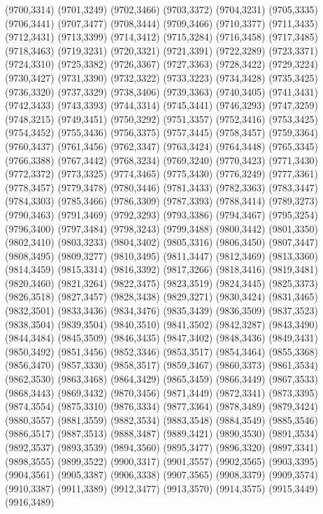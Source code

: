 (9700,3314)
(9701,3249)
(9702,3466)
(9703,3372)
(9704,3231)
(9705,3335)
(9706,3441)
(9707,3477)
(9708,3444)
(9709,3466)
(9710,3377)
(9711,3435)
(9712,3431)
(9713,3399)
(9714,3412)
(9715,3284)
(9716,3458)
(9717,3485)
(9718,3463)
(9719,3231)
(9720,3321)
(9721,3391)
(9722,3289)
(9723,3371)
(9724,3310)
(9725,3382)
(9726,3367)
(9727,3363)
(9728,3422)
(9729,3224)
(9730,3427)
(9731,3390)
(9732,3322)
(9733,3223)
(9734,3428)
(9735,3425)
(9736,3320)
(9737,3329)
(9738,3406)
(9739,3363)
(9740,3405)
(9741,3431)
(9742,3433)
(9743,3393)
(9744,3314)
(9745,3441)
(9746,3293)
(9747,3259)
(9748,3215)
(9749,3451)
(9750,3292)
(9751,3357)
(9752,3416)
(9753,3425)
(9754,3452)
(9755,3436)
(9756,3375)
(9757,3445)
(9758,3457)
(9759,3364)
(9760,3437)
(9761,3456)
(9762,3347)
(9763,3424)
(9764,3448)
(9765,3345)
(9766,3388)
(9767,3442)
(9768,3234)
(9769,3240)
(9770,3423)
(9771,3430)
(9772,3372)
(9773,3325)
(9774,3465)
(9775,3430)
(9776,3249)
(9777,3361)
(9778,3457)
(9779,3478)
(9780,3446)
(9781,3433)
(9782,3363)
(9783,3447)
(9784,3303)
(9785,3466)
(9786,3309)
(9787,3393)
(9788,3414)
(9789,3273)
(9790,3463)
(9791,3469)
(9792,3293)
(9793,3386)
(9794,3467)
(9795,3254)
(9796,3400)
(9797,3484)
(9798,3243)
(9799,3488)
(9800,3442)
(9801,3350)
(9802,3410)
(9803,3233)
(9804,3402)
(9805,3316)
(9806,3450)
(9807,3447)
(9808,3495)
(9809,3277)
(9810,3495)
(9811,3447)
(9812,3469)
(9813,3360)
(9814,3459)
(9815,3314)
(9816,3392)
(9817,3266)
(9818,3416)
(9819,3481)
(9820,3460)
(9821,3264)
(9822,3475)
(9823,3519)
(9824,3445)
(9825,3373)
(9826,3518)
(9827,3457)
(9828,3438)
(9829,3271)
(9830,3424)
(9831,3465)
(9832,3501)
(9833,3436)
(9834,3476)
(9835,3439)
(9836,3509)
(9837,3523)
(9838,3504)
(9839,3504)
(9840,3510)
(9841,3502)
(9842,3287)
(9843,3490)
(9844,3484)
(9845,3509)
(9846,3435)
(9847,3402)
(9848,3436)
(9849,3431)
(9850,3492)
(9851,3456)
(9852,3346)
(9853,3517)
(9854,3464)
(9855,3368)
(9856,3470)
(9857,3330)
(9858,3517)
(9859,3467)
(9860,3373)
(9861,3534)
(9862,3530)
(9863,3468)
(9864,3429)
(9865,3459)
(9866,3449)
(9867,3533)
(9868,3443)
(9869,3432)
(9870,3456)
(9871,3449)
(9872,3341)
(9873,3395)
(9874,3554)
(9875,3310)
(9876,3334)
(9877,3364)
(9878,3489)
(9879,3424)
(9880,3557)
(9881,3559)
(9882,3534)
(9883,3548)
(9884,3549)
(9885,3546)
(9886,3517)
(9887,3513)
(9888,3487)
(9889,3421)
(9890,3530)
(9891,3534)
(9892,3537)
(9893,3539)
(9894,3560)
(9895,3477)
(9896,3320)
(9897,3341)
(9898,3555)
(9899,3522)
(9900,3317)
(9901,3557)
(9902,3565)
(9903,3395)
(9904,3561)
(9905,3387)
(9906,3338)
(9907,3565)
(9908,3379)
(9909,3574)
(9910,3387)
(9911,3389)
(9912,3477)
(9913,3570)
(9914,3575)
(9915,3449)
(9916,3489)
